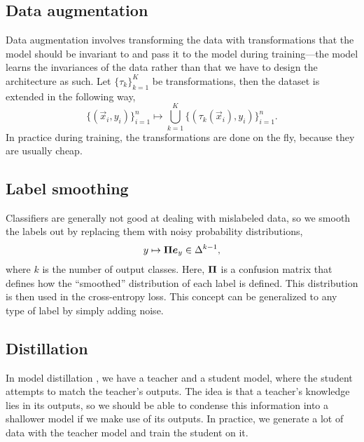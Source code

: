 \subsection{Data augmentation}

Data augmentation involves transforming the data with transformations that the model should be
invariant to and pass it to the model during training---the model learns the invariances of the
data rather than that we have to design the architecture as such. Let $\{ \tau_k \}_{k=1}^K$ be
transformations, then the dataset is extended in the following way, \[
    \{ (\vec{x}_i, y_i) \}_{i=1}^n \mapsto \bigcup_{k=1}^K \{ (\tau_k(\vec{x}_i), y_i) \}_{i=1}^n.
\]
In practice during training, the transformations are done on the fly, because they are usually
cheap.

\subsection{Label smoothing}

Classifiers are generally not good at dealing with mislabeled data, so we smooth the labels out by
replacing them with noisy probability distributions, \[
    y \mapsto \bm{\Pi} \bm{e}_y \in \Delta^{k-1},
\]
where $k$ is the number of output classes. Here, $\bm{\Pi}$ is a confusion matrix that defines how
the ``smoothed'' distribution of each label is defined. This distribution is then used in the
cross-entropy loss. This concept can be generalized to any type of label by simply adding noise.

\subsection{Distillation}

In model distillation \citep{hinton2015distilling}, we have a teacher and a student model, where
the student attempts to match the teacher's outputs. The idea is that a teacher's knowledge lies in
its outputs, so we should be able to condense this information into a shallower model if we make
use of its outputs. In practice, we generate a lot of data with the teacher model and train the
student on it.

